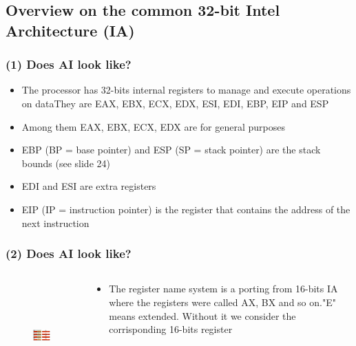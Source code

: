 \documentclass[]{beamer}
\begin{document}
	\subsection{Overview on the common 32-bit Intel Architecture (IA)}
		\begin{frame}
			\frametitle{(1) Does AI look like?}
			\begin{itemize}
				\item{The processor has 32-bits internal registers to manage and execute operations on data\newline They are EAX, EBX, ECX, EDX, ESI, EDI, EBP, EIP and ESP }
				\item{Among them EAX, EBX, ECX, EDX are for general purposes}
				\item{EBP (BP = base pointer) and ESP (SP = stack pointer) are the stack bounds (see slide 24)}
				\item{EDI and ESI are extra registers}
				\item{EIP (IP = instruction pointer) is the register that contains the address of the next instruction}
			\end{itemize}
		\end{frame}
		\begin{frame}
			\frametitle{(2) Does AI look like?}
			\begin{columns}
				\begin{column}[left]{2.5in}
					\begin{figure}
						\includegraphics[height=1.6in]{images/registers.jpeg}
						\label{Registers Division}
					\end{figure}
				\end{column}
				\begin{column}[right]{2.5in}
					\begin{itemize}
							\item{The register name system is a porting from 16-bits IA where the registers were called AX, BX and so on.\newline "E" means extended. Without it we consider the corrisponding 16-bits register}\end{itemize}
				\end{column}
			\end{columns}
		\end{frame}
\end{document}
